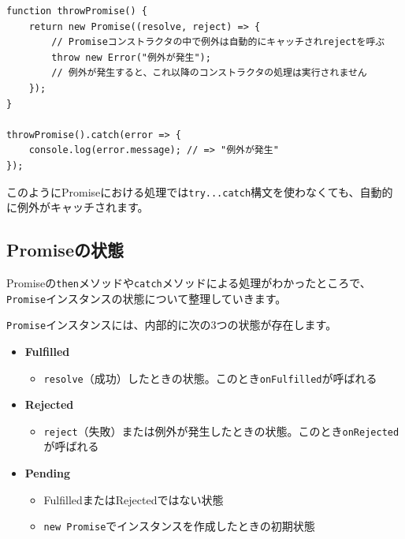 \begin{lstlisting}
function throwPromise() {
    return new Promise((resolve, reject) => {
        // Promiseコンストラクタの中で例外は自動的にキャッチされrejectを呼ぶ
        throw new Error("例外が発生");
        // 例外が発生すると、これ以降のコンストラクタの処理は実行されません
    });
}

throwPromise().catch(error => {
    console.log(error.message); // => "例外が発生"
});
\end{lstlisting}

このようにPromiseにおける処理では\texttt{try...catch}構文を使わなくても、自動的に例外がキャッチされます。

\hypertarget{promise-status}{%
\subsection{Promiseの状態}\label{promise-status}}

Promiseの\texttt{then}メソッドや\texttt{catch}メソッドによる処理がわかったところで、\texttt{Promise}インスタンスの状態について整理していきます。

\texttt{Promise}インスタンスには、内部的に次の3つの状態が存在します。

\begin{itemize}
\item
  \textbf{Fulfilled}

  \begin{itemize}
  \item
    \texttt{resolve}（成功）したときの状態。このとき\texttt{onFulfilled}が呼ばれる
  \end{itemize}
\item
  \textbf{Rejected}

  \begin{itemize}
  \item
    \texttt{reject}（失敗）または例外が発生したときの状態。このとき\texttt{onRejected}が呼ばれる
  \end{itemize}
\item
  \textbf{Pending}

  \begin{itemize}
  \item
    FulfilledまたはRejectedではない状態
  \item
    \texttt{new Promise}でインスタンスを作成したときの初期状態
  \end{itemize}
\end{itemize}

